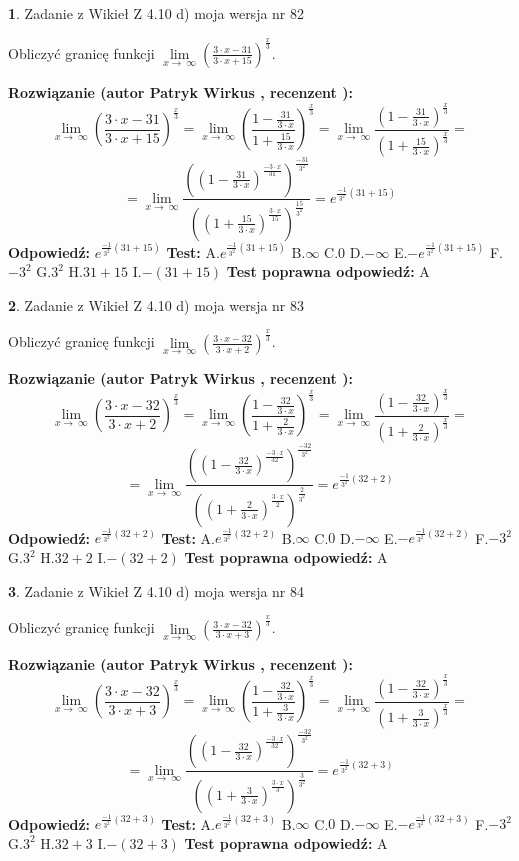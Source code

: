 \documentclass[12pt, a4paper]{article}
\theoremstyle{definition} %
\newtheorem{zad}{}
\newcommand{\zadStart}[1]{\begin{zad}#1\newline}
\newcommand{\zadStop}{\end{zad}}
\newcommand{\rozwStart}[2]{\noindent \textbf{Rozwiązanie (autor #1 , recenzent #2): }\newline}
\newcommand{\rozwStop}{\newline}
\newcommand{\odpStart}{\noindent \textbf{Odpowiedź:}\newline}
\newcommand{\odpStop}{\newline}
\newcommand{\testStart}{\noindent \textbf{Test:}\newline}
\newcommand{\testStop}{\newline}
\newcommand{\kluczStart}{\noindent \textbf{Test poprawna odpowiedź:}\newline}
\newcommand{\kluczStop}{\newline}
\begin{document}
\zadStart{Zadanie z Wikieł Z 4.10 d) moja wersja nr 82}


Obliczyć granicę funkcji  $\lim\limits_{x\to\ \infty}(\frac{3\cdot x-31}{3\cdot x+15})^{\frac{x}{3}}$.
\zadStop
\rozwStart{Patryk Wirkus}{}
$$\lim\limits_{x\to\ \infty}(\frac{3\cdot x-31}{3\cdot x+15})^{\frac{x}{3}} = \lim\limits_{x\to\ \infty}(\frac{1-\frac{31}{3\cdot x}}{1+\frac{15}{3\cdot x}})^{\frac{x}{3}}=\lim\limits_{x\to\ \infty}\frac{(1-\frac{31}{3\cdot x})^{\frac{x}{3}}}{(1+\frac{15}{3\cdot x})^{\frac{x}{3}}}=$$
$$=\lim\limits_{x\to\ \infty}\frac{((1-\frac{31}{3\cdot x})^{\frac{-3\cdot x}{31}})^{\frac{-31}{3^{2}}}}{((1+\frac{15}{3\cdot x})^{\frac{3\cdot x}{15}})^{\frac{15}{3^{2}}}}=e^{\frac{-1}{3^{2}}(31+15)}$$
\rozwStop
\odpStart
$e^{\frac{-1}{3^{2}}(31+15)}$
\odpStop
\testStart
A.$e^{\frac{-1}{3^{2}}(31+15)}$ B.$\infty$ C.$0$ D.$-\infty$ E.$-e^{\frac{-1}{3^{2}}(31+15)}$
F.$-3^{2}$ G.$3^{2}$
H.$31+15$
I.$-(31+15)$
\testStop
\kluczStart
A
\kluczStop



\zadStart{Zadanie z Wikieł Z 4.10 d) moja wersja nr 83}


Obliczyć granicę funkcji  $\lim\limits_{x\to\ \infty}(\frac{3\cdot x-32}{3\cdot x+2})^{\frac{x}{3}}$.
\zadStop
\rozwStart{Patryk Wirkus}{}
$$\lim\limits_{x\to\ \infty}(\frac{3\cdot x-32}{3\cdot x+2})^{\frac{x}{3}} = \lim\limits_{x\to\ \infty}(\frac{1-\frac{32}{3\cdot x}}{1+\frac{2}{3\cdot x}})^{\frac{x}{3}}=\lim\limits_{x\to\ \infty}\frac{(1-\frac{32}{3\cdot x})^{\frac{x}{3}}}{(1+\frac{2}{3\cdot x})^{\frac{x}{3}}}=$$
$$=\lim\limits_{x\to\ \infty}\frac{((1-\frac{32}{3\cdot x})^{\frac{-3\cdot x}{32}})^{\frac{-32}{3^{2}}}}{((1+\frac{2}{3\cdot x})^{\frac{3\cdot x}{2}})^{\frac{2}{3^{2}}}}=e^{\frac{-1}{3^{2}}(32+2)}$$
\rozwStop
\odpStart
$e^{\frac{-1}{3^{2}}(32+2)}$
\odpStop
\testStart
A.$e^{\frac{-1}{3^{2}}(32+2)}$ B.$\infty$ C.$0$ D.$-\infty$ E.$-e^{\frac{-1}{3^{2}}(32+2)}$
F.$-3^{2}$ G.$3^{2}$
H.$32+2$
I.$-(32+2)$
\testStop
\kluczStart
A
\kluczStop



\zadStart{Zadanie z Wikieł Z 4.10 d) moja wersja nr 84}


Obliczyć granicę funkcji  $\lim\limits_{x\to\ \infty}(\frac{3\cdot x-32}{3\cdot x+3})^{\frac{x}{3}}$.
\zadStop
\rozwStart{Patryk Wirkus}{}
$$\lim\limits_{x\to\ \infty}(\frac{3\cdot x-32}{3\cdot x+3})^{\frac{x}{3}} = \lim\limits_{x\to\ \infty}(\frac{1-\frac{32}{3\cdot x}}{1+\frac{3}{3\cdot x}})^{\frac{x}{3}}=\lim\limits_{x\to\ \infty}\frac{(1-\frac{32}{3\cdot x})^{\frac{x}{3}}}{(1+\frac{3}{3\cdot x})^{\frac{x}{3}}}=$$
$$=\lim\limits_{x\to\ \infty}\frac{((1-\frac{32}{3\cdot x})^{\frac{-3\cdot x}{32}})^{\frac{-32}{3^{2}}}}{((1+\frac{3}{3\cdot x})^{\frac{3\cdot x}{3}})^{\frac{3}{3^{2}}}}=e^{\frac{-1}{3^{2}}(32+3)}$$
\rozwStop
\odpStart
$e^{\frac{-1}{3^{2}}(32+3)}$
\odpStop
\testStart
A.$e^{\frac{-1}{3^{2}}(32+3)}$ B.$\infty$ C.$0$ D.$-\infty$ E.$-e^{\frac{-1}{3^{2}}(32+3)}$
F.$-3^{2}$ G.$3^{2}$
H.$32+3$
I.$-(32+3)$
\testStop
\kluczStart
A
\kluczStop
\end{document}
